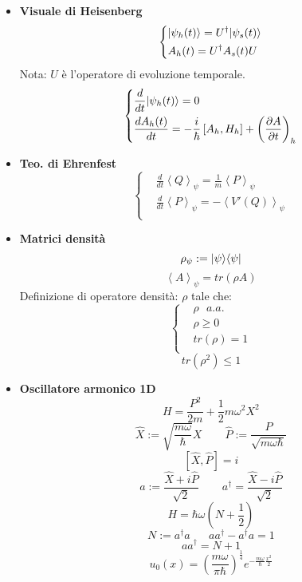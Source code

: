 \documentclass{article}
\DeclarePairedDelimiter\bra{\langle}{\rvert}
\DeclarePairedDelimiter\ket{\lvert}{\rangle}
\begin{document}
\begin{small}
\begin{multicols*}{3}
\begin{itemize}[leftmargin=*]
\begin{itemize}
				
		\end{itemize}
	\item \textbf{Visuale di Heisenberg}
		\[
			\left\{\begin{aligned}
				&\ket*{\psi _h(t)} = U^\dag \ket*{\psi _s(t)} \\
				&A_h(t) = U^\dag A_s(t) U\\
			\end{aligned}\right.
		\]
		Nota: $U$ è l'operatore di evoluzione temporale.
		\[
			\left\{\begin{aligned}
				&\frac{d}{dt}\ket*{\psi _h(t)} = 0 \\
				&\frac{dA_h(t)}{dt} = -\frac{i}{\hbar }\left[A_h, H_h\right] + \left(\frac{\partial A}{\partial t}\right)_h\\
			\end{aligned}\right.
		\]
	\item \textbf{Teo. di Ehrenfest}
		\[
			\left\{\begin{aligned}
				&\frac{d}{dt}\left< Q\right>_\psi = \frac{1}{m} \left< P\right>_\psi \\
				&\frac{d}{dt}\left< P\right>_\psi = -\left< V'(Q)\right>_\psi \\ 
			\end{aligned}\right.
		\]
	\item \textbf{Matrici densità}
		\[\rho _\psi := \ket*{\psi }\bra*{\psi }\]
		\[\left< A\right>_\psi = tr\left(\rho A\right)\]
		Definizione di operatore densità: $\rho $ tale che:
		\[
			\left\{\begin{aligned}
				&\rho \ \ \  a.a.\\
				&\rho \geq 0\\
				&tr (\rho) =1\\
			\end{aligned}\right.
		\]
		\[tr(\rho ^2)\leq 1\]
	\item \textbf{Oscillatore armonico 1D}
		\[H=\frac{P^2}{2m} + \frac{1}{2}m\omega ^2X^2\]
		\[\widehat{X}:=\sqrt{\frac{m\omega }{\hbar }}X \hspace{25pt} \widehat{P}:=\frac{P}{\sqrt{m\omega \hbar }}\]
		\[\left[\widehat{X}, \widehat{P}\right] = i\]
		\[a := \frac{\widehat{X}+i\widehat{P}}{\sqrt{2}} \hspace{25pt} a^\dag = \frac{\widehat{X}-i\widehat{P}}{\sqrt{2}}\]
		\[H = \hbar \omega \left(N+\frac{1}{2}\right)\]
		\[N:=a^\dag a\hspace{20pt} aa^\dag - a^\dag a = 1 \]\[ aa^\dag=N+1\]
		\[u_0(x) = \left( \frac{m\omega }{\pi \hbar }\right)^{\frac{1}{4}} e^{-\frac{m\omega }{\hbar }\frac{x^2}{2}}\]

\end{itemize}
\end{multicols*}
\end{small}
\end{document}
